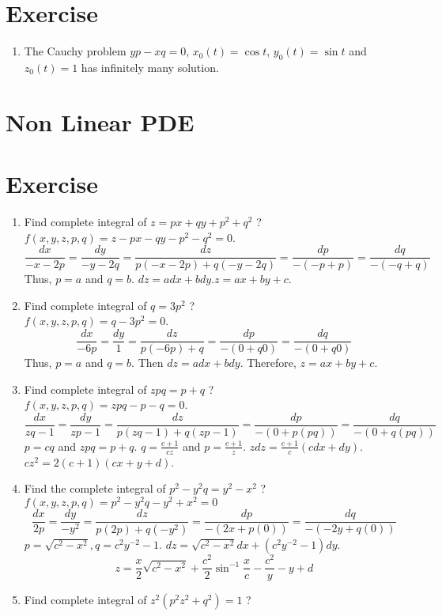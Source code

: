 \section*{Exercise}
\begin{enumerate}
	\item The Cauchy problem $yp-xq = 0$, $x_0(t) = \cos t$, $y_0(t) = \sin t$ and $z_0(t) = 1$ has infinitely many solution.
\end{enumerate}

\section{Non Linear PDE}
\section*{Exercise}
\begin{enumerate}
	\item Find complete integral of $z = px + qy + p^2 + q^2$ ?\\ $f(x,y,z,p,q) = z - px - qy - p^2 - q^2 = 0$.
	$$\frac{dx}{-x-2p} = \frac{dy}{-y-2q} = \frac{dz}{p(-x-2p) + q(-y-2q)} = \frac{dp}{-(-p+p)} = \frac{dq}{-(-q+q)}$$
	Thus, $p = a$ and $q = b$. $dz = adx + bdy$.$z = ax + by + c$.
\item Find complete integral of $q = 3p^2$ ?\\ $f(x,y,z,p,q) = q-3p^2 = 0$.
	$$\frac{dx}{-6p} = \frac{dy}{1} = \frac{dz}{p(-6p)+q} = \frac{dp}{-(0+q0)} = \frac{dq}{-(0+q0)}$$
	Thus, $p = a$ and $q = b$. Then $dz = adx + bdy$. Therefore, $z = ax + by + c$.
\item Find complete integral of $zpq = p+q$ ?\\ $f(x,y,z,p,q) = zpq - p - q = 0$.
	$$\frac{dx}{zq - 1} = \frac{dy}{zp - 1} = \frac{dz}{p(zq-1)+q(zp-1)} = \frac{dp}{-(0+p(pq))} = \frac{dq}{-(0+q(pq))}$$
		$p = cq$ and $zpq = p + q$. $q = \frac{c + 1}{cz}$ and $p = \frac{c+1}{z}$. $zdz = \frac{c+1}{c} (cdx + dy)$.\\ $cz^2 = 2(c+1)(cx + y + d)$.
	\item Find the complete integral of $p^2 - y^2q = y^2 - x^2$ ?\\ $f(x,y,z,p,q) = p^2 - y^2q - y^2 + x^2 = 0$
	$$\frac{dx}{2p} = \frac{dy}{-y^2} = \frac{dz}{p(2p)+q(-y^2)} = \frac{dp}{-(2x+p(0))} = \frac{dq}{-(-2y+q(0))}$$
	$p = \sqrt{c^2-x^2}, q = c^2y^{-2}-1$. $dz = \sqrt{c^2-x^2} dx + (c^2y^{-2} -1)dy$.
		$$z = \frac{x}{2} \sqrt{c^2 - x^2} + \frac{c^2}{2} \sin^{-1} \frac{x}{c} - \frac{c^2}{y} - y + d$$
	\item Find complete integral of $z^2(p^2z^2+q^2) = 1$ ?\\

\end{enumerate}
